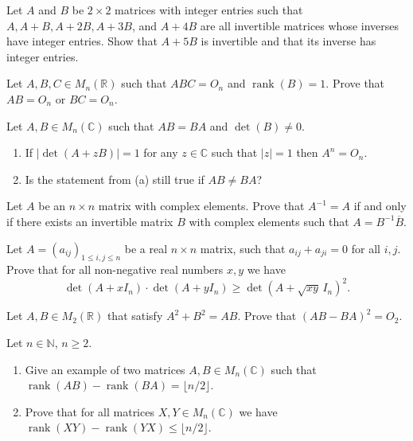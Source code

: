 \documentclass[12pt]{article}
\begin{document}
\begin{problem}
Let $A$ and $B$ be $2\times 2$ matrices with integer entries such that $A,A+B,A+2B,A+3B$, and $A+4B$ are all invertible matrices whose inverses have integer entries. Show that $A+5B$ is invertible and that its inverse has integer entries.
\end{problem}

\begin{problem}
Let $A,B,C\in M_n(\mathbb{R})$ such that $ABC=O_n$ and $\operatorname{rank}(B)=1$. Prove that $AB=O_n$ or $BC=O_n$.
\end{problem}

\begin{problem}
Let $A,B\in M_n(\mathbb{C})$ such that $AB=BA$ and $\det(B)\ne 0$.
\begin{enumerate}[label=(\alph*)]
\item If $|\det(A+zB)|=1$ for any $z\in\mathbb{C}$ such that $|z|=1$ then $A^n=O_n$.
\item Is the statement from (a) still true if $AB\ne BA$?
\end{enumerate}
\end{problem}

\begin{problem}
Let $A$ be an $n\times n$ matrix with complex elements. Prove that $A^{-1}=A$ if and only if there exists an invertible matrix $B$ with complex elements such that $A=B^{-1}\overline{B}$.
\end{problem}

\begin{problem}
Let $A=(a_{ij})_{1\le i,j\le n}$ be a real $n\times n$ matrix, such that $a_{ij}+a_{ji}=0$ for all $i,j$. Prove that for all non-negative real numbers $x,y$ we have
\[
\det(A+xI_n)\cdot\det(A+yI_n) \ge \det(A+\sqrt{xy}\,I_n)^2.
\]
\end{problem}

\begin{problem}
Let $A,B\in M_2(\mathbb{R})$ that satisfy $A^2+B^2=AB$. Prove that $(AB-BA)^2 = O_2$.
\end{problem}

\begin{problem}
Let $n\in\mathbb{N}$, $n\ge 2$.
\begin{enumerate}[label=(\alph*)]
\item Give an example of two matrices $A,B\in M_n(\mathbb{C})$ such that $\operatorname{rank}(AB)-\operatorname{rank}(BA) = \lfloor n/2\rfloor$.
\item Prove that for all matrices $X,Y\in M_n(\mathbb{C})$ we have $\operatorname{rank}(XY) - \operatorname{rank}(YX) \le \lfloor n/2\rfloor$.
\end{enumerate}
\end{problem}
\end{document}
